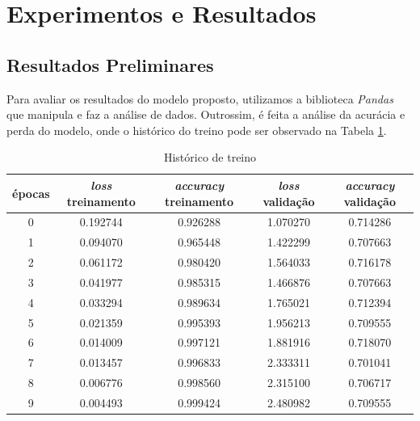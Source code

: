 
\section{\esp Experimentos e Resultados} \label{results}



\subsection{\esp Resultados Preliminares} \label{prelim}

Para avaliar os resultados do modelo proposto, utilizamos a biblioteca \textit{Pandas} que manipula e faz a análise de dados. Outrossim, é feita a análise da acurácia e perda do modelo, onde o histórico do treino pode ser observado na Tabela \ref{tab:history10}.

\begin{table}[h]
  \centering
  \caption{Histórico de treino}
   \label{tab:history10}
\begin{tabular}{|c|c|c|c|c|} 
  \hline
   épocas & \textit{loss} treinamento & \textit{accuracy} treinamento & \textit{loss} validação & \textit{accuracy} validação \\
  \hline
    0 & 0.192744 & 0.926288 & 1.070270 & 0.714286 \\
    1 & 0.094070 & 0.965448 & 1.422299 & 0.707663 \\
    2 & 0.061172 & 0.980420 & 1.564033 & 0.716178 \\
    3 & 0.041977 & 0.985315 & 1.466876 & 0.707663 \\
    4 & 0.033294 & 0.989634 & 1.765021 & 0.712394 \\
    5 & 0.021359 & 0.995393 & 1.956213 & 0.709555 \\
    6 & 0.014009 & 0.997121 & 1.881916 & 0.718070 \\
    7 & 0.013457 & 0.996833 & 2.333311 & 0.701041 \\
    8 & 0.006776 & 0.998560 & 2.315100 & 0.706717 \\
    9 & 0.004493 & 0.999424 & 2.480982 & 0.709555 \\
  \hline
\end{tabular}

\end{table}


